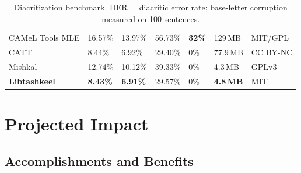\documentclass[10pt,a4paper]{article}
\begin{document}
\begin{table}[h]
\small
\caption{Diacritization benchmark. DER = diacritic error rate; base-letter
corruption measured on 100 sentences.}
\label{tab:diac}
\begin{tabularx}{\linewidth}{|L|C{13mm}|C{15mm}|C{13mm}|C{18mm}|C{14mm}|C{16mm}|}
\hline
{} &  &  &  &  &  &  \\ \hline
CAMeL Tools MLE \cite{cameltools} & 16.57\% & 13.97\% & 56.73\% & \textbf{32\%} & 129\,MB & MIT/GPL \\ \hline
CATT \cite{catt}                  & 8.44\%  & 6.92\%  & 29.40\% & 0\% & 77.9\,MB & CC BY-NC \\ \hline
Mishkal \cite{mishkal}            & 12.74\% & 10.12\% & 39.33\% & 0\% & 4.3\,MB & GPLv3 \\ \hline
\textbf{Libtashkeel} \cite{libtashkeel} & \textbf{8.43\%} & \textbf{6.91\%} & 29.57\% & 0\% & \textbf{4.8\,MB} & MIT \\ \hline
\end{tabularx}
\end{table}

\section{Projected Impact}

\subsection{Accomplishments and Benefits}
\label{sec:accomplish}
\end{document}
